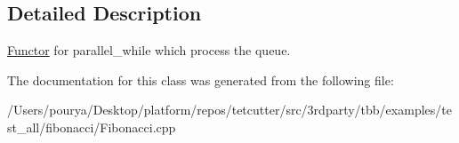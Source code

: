 \subsection{Detailed Description}
\hyperlink{structFunctor}{Functor} for parallel\+\_\+while which process the queue. 

The documentation for this class was generated from the following file\+:\begin{DoxyCompactItemize}
\item 
/\+Users/pourya/\+Desktop/platform/repos/tetcutter/src/3rdparty/tbb/examples/test\+\_\+all/fibonacci/Fibonacci.\+cpp\end{DoxyCompactItemize}
